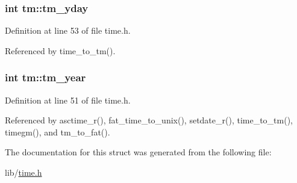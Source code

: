 \hypertarget{structtm_a93a0ba77cc23796df84405dcbcc57eb1}{
\subsubsection[{tm\-\_\-yday}]{\setlength{\rightskip}{0pt plus 5cm}int tm\-::tm\-\_\-yday}}\label{structtm_a93a0ba77cc23796df84405dcbcc57eb1}


Definition at line 53 of file time.\-h.



Referenced by time\-\_\-to\-\_\-tm().

\hypertarget{structtm_a33adf78fd6476b2120ce3b9c4a852053}{
\subsubsection[{tm\-\_\-year}]{\setlength{\rightskip}{0pt plus 5cm}int tm\-::tm\-\_\-year}}\label{structtm_a33adf78fd6476b2120ce3b9c4a852053}


Definition at line 51 of file time.\-h.



Referenced by asctime\-\_\-r(), fat\-\_\-time\-\_\-to\-\_\-unix(), setdate\-\_\-r(), time\-\_\-to\-\_\-tm(), timegm(), and tm\-\_\-to\-\_\-fat().



The documentation for this struct was generated from the following file\-:\begin{DoxyCompactItemize}
\item 
lib/\hyperlink{time_8h}{time.\-h}\end{DoxyCompactItemize}
